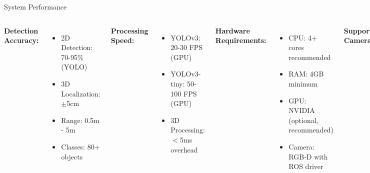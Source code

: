 \documentclass[aspectratio=169]{beamer}
\begin{document}
\begin{frame}{System Performance}
\begin{columns}
\textbf{Detection Accuracy:}
\begin{itemize}
    \item 2D Detection: 70-95\% (YOLO)
    \item 3D Localization: $\pm$5cm
    \item Range: 0.5m - 5m
    \item Classes: 80+ objects
\end{itemize}

\vspace{1em}
\textbf{Processing Speed:}
\begin{itemize}
    \item YOLOv3: 20-30 FPS (GPU)
    \item YOLOv3-tiny: 50-100 FPS (GPU)
    \item 3D Processing: $<$5ms overhead
\end{itemize}

\textbf{Hardware Requirements:}
\begin{itemize}
    \item CPU: 4+ cores recommended
    \item RAM: 4GB minimum
    \item GPU: NVIDIA (optional, recommended)
    \item Camera: RGB-D with ROS driver
\end{itemize}

\vspace{1em}
\textbf{Supported Cameras:}
\begin{itemize}
    \item Intel RealSense D435/D455
    \item Asus Xtion Pro
    \item Orbbec Astra
    \item Any with PointCloud2 output
\end{itemize}
\end{columns}
\end{frame}
\end{document}
